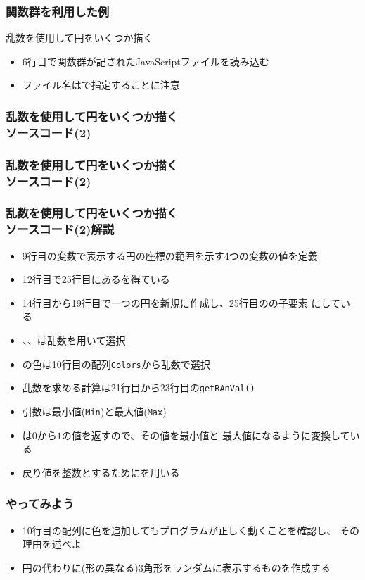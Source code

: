 \begin{frame}[containsverbatim]
 \frametitle{関数群を利用した例}
 乱数を使用して円をいくつか描く
 \begin{itemize}
  \item 6行目で関数群が記されたJavaScriptファイルを読み込む
  \item ファイル名はで指定することに注意
 \end{itemize}
\end{frame}
  \begin{frame}[containsverbatim]
   \frametitle{乱数を使用して円をいくつか描く\\ソースコード(2)}
 \end{frame}
  \begin{frame}[containsverbatim]
   \frametitle{乱数を使用して円をいくつか描く\\ソースコード(2)}
 \end{frame}
  \begin{frame}[containsverbatim]
   \frametitle{乱数を使用して円をいくつか描く\\ソースコード(2)解説}
\begin{itemize}
 \item 9行目の変数で表示する円の座標の範囲を示す4つの変数の値を定義
 \item 12行目で25行目にあるを得ている
 \item 14行目から19行目で一つの円を新規に作成し、25行目のの子要素
       にしている
 \item {}、、は乱数を用いて選択
 \item {}の色は10行目の配列\texttt{Colors}から乱数で選択
 \item 乱数を求める計算は21行目から23行目の\texttt{getRAnVal()}
 \item 引数は最小値(\texttt{Min})と最大値(\texttt{Max})
 \item {}は$0$から$1$の値を返すので、その値を最小値と
       最大値になるように変換している
 \item 戻り値を整数とするためにを用いる
\end{itemize}
  \end{frame}
\begin{frame}[containsverbatim]
 \frametitle{やってみよう}
 \begin{itemize}
  \item 10行目の配列に色を追加してもプログラムが正しく動くことを確認し、
        その理由を述べよ
  \item 円の代わりに(形の異なる)3角形をランダムに表示するものを作成する
 \end{itemize}
\end{frame}

\begin{frame}[containsverbatim]
 \frametitle{}
\end{frame}
